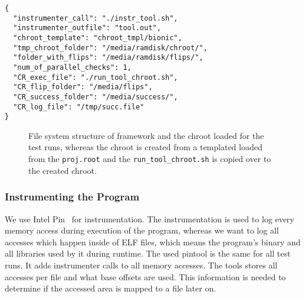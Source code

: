 \begin{minipage}{\linewidth}
\begin{lstlisting}[style=nasm,
                   caption={JSON style config file for the framework, showing
all parameters used to tweak each part of the framework. Entries
starting with \texttt{CR\_} are used inside the testing \texttt{chroot}.},
                   label={lst:expconfig}]
{
  "instrumenter_call": "./instr_tool.sh",
  "instrumenter_outfile": "tool.out",
  "chroot_template": "chroot_tmpl/bionic",
  "tmp_chroot_folder": "/media/ramdisk/chroot/",
  "folder_with_flips": "/media/ramdisk/flips/",
  "num_of_parallel_checks": 1,
  "CR_exec_file": "./run_tool_chroot.sh",
  "CR_flip_folder": "/media/flips",
  "CR_success_folder": "/media/success/",
  "CR_log_file": "/tmp/succ.file"
}
\end{lstlisting}
\end{minipage}

\begin{figure}
\centering
{}
\caption{File system structure of framework and the chroot loaded for the test
runs, whereas the chroot is created from a templated loaded from the
\texttt{proj.root} and the \texttt{run\_tool\_chroot.sh} is copied over to the
created chroot.}
\label{fig:framfilesys}
\end{figure}

\subsubsection{Instrumenting the Program}

We use Intel Pin~\cite{pintool} for instrumentation. The instrumentation is used
to log every memory access during execution of the program, whereas we want to
log all accesses which happen inside of ELF files, which means the program's
binary and all libraries used by it during runtime. The used pintool is the same
for all test runs. It adds instrumenter calls to all memory accesses. The tools
stores all accesses per file and what base offsets are used. This information is
needed to determine if the accessed area is mapped to a file later on.

